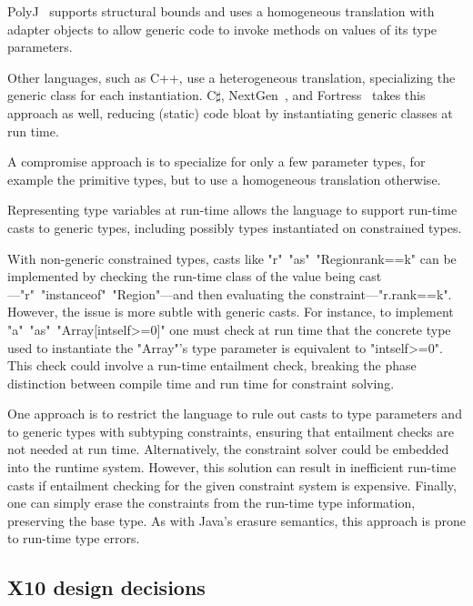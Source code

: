 PolyJ~\cite{java-popl97} supports structural bounds and uses a
homogeneous translation with adapter objects to allow generic
code to invoke methods on values of its type parameters.

Other languages, such as C++, use a heterogeneous
translation, specializing the generic class for each
instantiation.
C$\sharp$,
NextGen~\cite{nextgen}, and
Fortress~\cite{fortress} takes this approach as well, reducing
(static) code bloat by instantiating generic classes at run time.

A compromise approach is to specialize for only a few parameter
types, for example the primitive types, but to use a homogeneous
translation otherwise.

Representing type variables at run-time allows the language
to support run-time casts to generic types,
including possibly types instantiated on constrained types.

With
non-generic constrained types, casts like
\xcd"r"~\xcd"as"~\xcd"Region{rank==k}" can be implemented by
checking the run-time class of the value being
cast---\xcd"r"~\xcd"instanceof"~\xcd"Region"---and then
evaluating the constraint---\xcd"r.rank==k".
%
However, the issue is more subtle with generic casts.
For instance, to implement
\xcd"a"~\xcd"as"~\xcd"Array[int{self>=0}]"
one must check at run time that the concrete type used to instantiate
the \xcd"Array"'s type parameter is equivalent to
\xcd"int{self>=0}".  This check could involve a run-time
entailment check, 
breaking the phase distinction between
compile time and run time for constraint solving.

One approach is to restrict the language 
to rule out casts to type parameters 
and to generic types with subtyping constraints, ensuring that
entailment checks are not needed at run time.
Alternatively, 
the constraint solver could be embedded into the runtime system.
However, this
solution can result in inefficient run-time casts
if entailment checking for the given constraint system is expensive.
Finally, one can simply erase the constraints from the run-time
type information, preserving the base type.  As with Java's
erasure semantics, this approach is prone to run-time type
errors.

\subsection{X10 design decisions}

